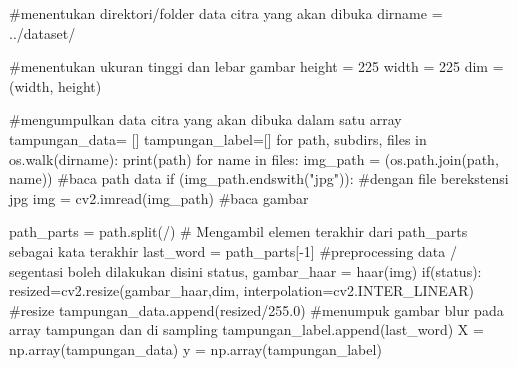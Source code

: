 \documentclass[
  letterpaper,
  DIV=11,
  numbers=noendperiod]{scrreprt}
\newenvironment{Shaded}{\begin{snugshade}}{\end{snugshade}}
\newcommand{\BuiltInTok}[1]{\textcolor[rgb]{0.00,0.23,0.31}{#1}}
\newcommand{\CommentTok}[1]{\textcolor[rgb]{0.37,0.37,0.37}{#1}}
\newcommand{\ControlFlowTok}[1]{\textcolor[rgb]{0.00,0.23,0.31}{#1}}
\newcommand{\DecValTok}[1]{\textcolor[rgb]{0.68,0.00,0.00}{#1}}
\newcommand{\FloatTok}[1]{\textcolor[rgb]{0.68,0.00,0.00}{#1}}
\newcommand{\KeywordTok}[1]{\textcolor[rgb]{0.00,0.23,0.31}{#1}}
\newcommand{\NormalTok}[1]{\textcolor[rgb]{0.00,0.23,0.31}{#1}}
\newcommand{\OperatorTok}[1]{\textcolor[rgb]{0.37,0.37,0.37}{#1}}
\newcommand{\StringTok}[1]{\textcolor[rgb]{0.13,0.47,0.30}{#1}}
\begin{document}
\begin{Shaded}
\begin{Highlighting}[]
\CommentTok{\#menentukan direktori/folder data citra yang akan dibuka}
\NormalTok{dirname }\OperatorTok{=} \StringTok{\textquotesingle{}../dataset/\textquotesingle{}}  

\CommentTok{\#menentukan ukuran tinggi dan lebar gambar}
\NormalTok{height }\OperatorTok{=} \DecValTok{225}
\NormalTok{width }\OperatorTok{=} \DecValTok{225}
\NormalTok{dim }\OperatorTok{=}\NormalTok{ (width, height)}

\CommentTok{\#mengumpulkan data citra yang akan dibuka dalam satu array}
\NormalTok{tampungan\_data}\OperatorTok{=}\NormalTok{ [] }
\NormalTok{tampungan\_label}\OperatorTok{=}\NormalTok{[]}
\ControlFlowTok{for}\NormalTok{ path, subdirs, files }\KeywordTok{in}\NormalTok{ os.walk(dirname):}
    \BuiltInTok{print}\NormalTok{(path)}
    \ControlFlowTok{for}\NormalTok{ name }\KeywordTok{in}\NormalTok{ files:}
\NormalTok{        img\_path }\OperatorTok{=}\NormalTok{ (os.path.join(path, name))  }\CommentTok{\#baca path data}
        \ControlFlowTok{if}\NormalTok{ (img\_path.endswith(}\StringTok{"jpg"}\NormalTok{)): }\CommentTok{\#dengan file berekstensi jpg}
\NormalTok{            img }\OperatorTok{=}\NormalTok{ cv2.imread(img\_path) }\CommentTok{\#baca gambar}
            
\NormalTok{            path\_parts }\OperatorTok{=}\NormalTok{ path.split(}\StringTok{\textquotesingle{}/\textquotesingle{}}\NormalTok{)}
            \CommentTok{\# Mengambil elemen terakhir dari path\_parts sebagai kata terakhir}
\NormalTok{            last\_word }\OperatorTok{=}\NormalTok{ path\_parts[}\OperatorTok{{-}}\DecValTok{1}\NormalTok{]}
            \CommentTok{\#preprocessing data / segentasi  boleh dilakukan disini}
\NormalTok{            status, gambar\_haar }\OperatorTok{=}\NormalTok{ haar(img)}
            \ControlFlowTok{if}\NormalTok{(status):}
\NormalTok{                resized}\OperatorTok{=}\NormalTok{cv2.resize(gambar\_haar,dim, interpolation}\OperatorTok{=}\NormalTok{cv2.INTER\_LINEAR) }\CommentTok{\#resize}
\NormalTok{                tampungan\_data.append(resized}\OperatorTok{/}\FloatTok{255.0}\NormalTok{) }\CommentTok{\#menumpuk gambar blur pada array tampungan dan di sampling}
\NormalTok{                tampungan\_label.append(last\_word)}
\NormalTok{    X }\OperatorTok{=}\NormalTok{ np.array(tampungan\_data) }
\NormalTok{    y }\OperatorTok{=}\NormalTok{ np.array(tampungan\_label)}
\end{Highlighting}
\end{Shaded}
\end{document}
